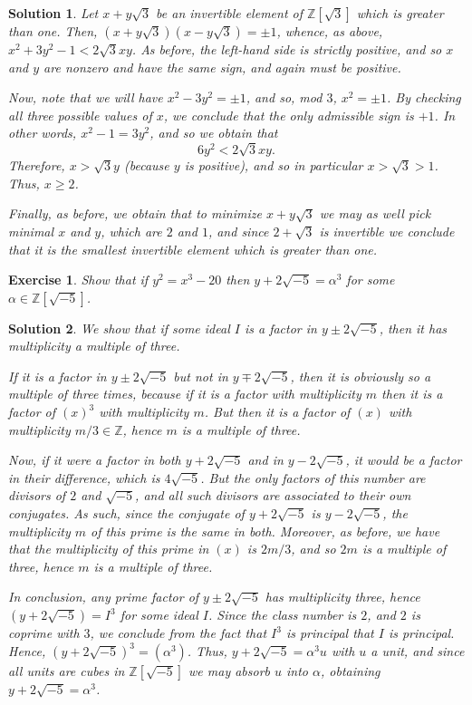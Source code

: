 \documentclass{article}
\newtheorem{ex}{Exercise}
\theoremstyle{nonumberplain}
\newtheorem{sol}{Solution}
\newcommand{\Z}{\mathbb{Z}}
\begin{document}
\begin{sol}
Let $x + y \sqrt3$ be an invertible element of $\Z[\sqrt3]$ which is greater than one. Then, $(x+y\sqrt3)(x-y\sqrt3) = \pm 1$, whence, as above, $x^2 + 3 y^2 - 1 < 2 \sqrt3 xy$. As before, the left-hand side is strictly positive, and so $x$ and $y$ are nonzero and have the same sign, and again must be positive.

Now, note that we will have $x^2 - 3y^2 = \pm 1$, and so, mod $3$, $x^2 = \pm 1$. By checking all three possible values of $x$, we conclude that the only admissible sign is $+1$. In other words, $x^2 - 1 = 3 y^2$, and so we obtain that
\begin{equation}
6 y^2 < 2 \sqrt 3 xy.
\end{equation}
Therefore, $x > \sqrt3 y$ (because $y$ is positive), and so in particular $x > \sqrt3 > 1$. Thus, $x \geq 2$.

Finally, as before, we obtain that to minimize $x+y\sqrt3$ we may as well pick minimal $x$ and $y$, which are $2$ and $1$, and since $2+\sqrt3$ is invertible we conclude that it is the smallest invertible element which is greater than one.
\end{sol}

\begin{ex}
Show that if $y^2 = x^3 - 20$ then $y + 2 \sqrt{-5} = \alpha^3$ for some $\alpha \in \Z[\sqrt{-5}]$.
\end{ex}

\begin{sol}
We show that if some ideal $I$ is a factor in $y\pm 2 \sqrt{-5}$, then it has multiplicity a multiple of three.

If it is a factor in $y \pm 2 \sqrt{-5}$ but not in $y \mp 2 \sqrt{-5}$, then it is obviously so a multiple of three times, because if it is a factor with multiplicity $m$ then it is a factor of $(x)^3$ with multiplicity $m$. But then it is a factor of $(x)$ with multiplicity $m/3 \in \Z$, hence $m$ is a multiple of three.

Now, if it were a factor in both $y + 2 \sqrt{-5}$ and in $y - 2 \sqrt{-5}$, it would be a factor in their difference, which is $4 \sqrt{-5}$. But the only factors of this number are divisors of $2$ and $\sqrt{-5}$, and all such divisors are associated to their own conjugates. As such, since the conjugate of $y+2\sqrt{-5}$ is $y-2\sqrt{-5}$, the multiplicity $m$ of this prime is the same in both. Moreover, as before, we have that the multiplicity of this prime in $(x)$ is $2m/3$, and so $2m$ is a multiple of three, hence $m$ is a multiple of three.

In conclusion, any prime factor of $y\pm2\sqrt{-5}$ has multiplicity three, hence $(y + 2 \sqrt{-5}) = I^3$ for some ideal $I$. Since the class number is $2$, and $2$ is coprime with $3$, we conclude from the fact that $I^3$ is principal that $I$ is principal. Hence, $(y+2\sqrt{-5})^3 = (\alpha^3)$. Thus, $y+2\sqrt{-5} = \alpha^3 u$ with $u$ a unit, and since all units are cubes in $\Z[\sqrt{-5}]$ we may absorb $u$ into $\alpha$, obtaining $y+2\sqrt{-5} = \alpha^3$.
\end{sol}
\end{document}

